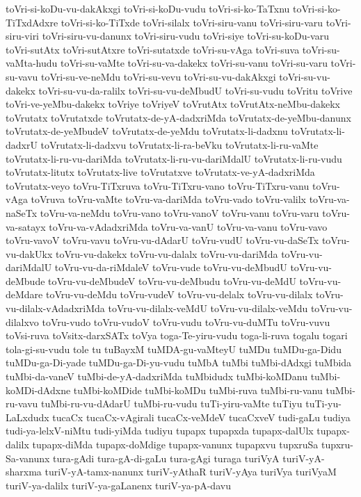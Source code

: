 {toVri-si-koDu-vu-dakAkxgi
toVri-si-koDu-vudu
toVri-si-ko-TaTxnu
toVri-si-ko-TiTxdAdxre
toVri-si-ko-TiTxde
toVri-silalx
toVri-siru-vanu
toVri-siru-varu
toVri-siru-viri
toVri-siru-vu-danunx
toVri-siru-vudu
toVri-siye
toVri-su-koDu-varu
toVri-sutAtx
toVri-sutAtxre
toVri-sutatxde
toVri-su-vAga
toVri-suva
toVri-su-vaMta-hudu
toVri-su-vaMte
toVri-su-va-dakekx
toVri-su-vanu
toVri-su-varu
toVri-su-vavu
toVri-su-ve-neMdu
toVri-su-vevu
toVri-su-vu-dakAkxgi
toVri-su-vu-dakekx
toVri-su-vu-da-ralilx
toVri-su-vu-deMbudU
toVri-su-vudu
toVritu
toVrive
toVri-ve-yeMbu-dakekx
toVriye
toVriyeV
toVrutAtx
toVrutAtx-neMbu-dakekx
toVrutatx
toVrutatxde
toVrutatx-de-yA-dadxriMda
toVrutatx-de-yeMbu-danunx
toVrutatx-de-yeMbudeV
toVrutatx-de-yeMdu
toVrutatx-li-dadxnu
toVrutatx-li-dadxrU
toVrutatx-li-dadxvu
toVrutatx-li-ra-beVku
toVrutatx-li-ru-vaMte
toVrutatx-li-ru-vu-dariMda
toVrutatx-li-ru-vu-dariMdalU
toVrutatx-li-ru-vudu
toVrutatx-litutx
toVrutatx-live
toVrutatxve
toVrutatx-ve-yA-dadxriMda
toVrutatx-veyo
toVru-TiTxruva
toVru-TiTxru-vano
toVru-TiTxru-vanu
toVru-vAga
toVruva
toVru-vaMte
toVru-va-dariMda
toVru-vado
toVru-valilx
toVru-va-naSeTx
toVru-va-neMdu
toVru-vano
toVru-vanoV
toVru-vanu
toVru-varu
toVru-va-satayx
toVru-va-vAdadxriMda
toVru-va-vanU
toVru-va-vanu
toVru-vavo
toVru-vavoV
toVru-vavu
toVru-vu-dAdarU
toVru-vudU
toVru-vu-daSeTx
toVru-vu-dakUkx
toVru-vu-dakekx
toVru-vu-dalalx
toVru-vu-dariMda
toVru-vu-dariMdalU
toVru-vu-da-riMdaleV
toVru-vude
toVru-vu-deMbudU
toVru-vu-deMbude
toVru-vu-deMbudeV
toVru-vu-deMbudu
toVru-vu-deMdU
toVru-vu-deMdare
toVru-vu-deMdu
toVru-vudeV
toVru-vu-delalx
toVru-vu-dilalx
toVru-vu-dilalx-vAdadxriMda
toVru-vu-dilalx-veMdU
toVru-vu-dilalx-veMdu
toVru-vu-dilalxvo
toVru-vudo
toVru-vudoV
toVru-vudu
toVru-vu-duMTu
toVru-vuvu
toVsi-ruva
toVsitx-darxSATx
toVya
toga-Te-yiru-vudu
toga-li-ruva
togalu
togari
tola-gi-su-vudu
tole
tu
tuBayxM
tuMDA-gu-vaMteyU
tuMDu
tuMDu-ga-Didu
tuMDu-ga-Di-yade
tuMDu-ga-Di-yu-vudu
tuMbA
tuMbi
tuMbi-dAdxgi
tuMbida
tuMbi-da-vaneV
tuMbi-de-yA-dadxriMda
tuMbidudx
tuMbi-koMDanu
tuMbi-koMDi-dAdxne
tuMbi-koMDide
tuMbi-koMDu
tuMbi-ruva
tuMbi-ru-vanu
tuMbi-ru-vavu
tuMbi-ru-vu-dAdarU
tuMbi-ru-vudu
tuTi-yiru-vaMte
tuTiyu
tuTi-yu-LaLxdudx
tucaCx
tucaCx-vAgirali
tucaCx-veMdeV
tucaCxveV
tudi-gaLu
tudiya
tudi-ya-lelxV-niMtu
tudi-yiMda
tudiyu
tupapx
tupapxda
tupapx-dalUlx
tupapx-dalilx
tupapx-diMda
tupapx-doMdige
tupapx-vanunx
tupapxvu
tupxruSa
tupxru-Sa-vanunx
tura-gAdi
tura-gA-di-gaLu
tura-gAgi
turaga
turiVyA
turiV-yA-sharxma
turiV-yA-tamx-nanunx
turiV-yAthaR
turiV-yAya
turiVya
turiVyaM
turiV-ya-dalilx
turiV-ya-gaLanenx
turiV-ya-pA-davu
}
